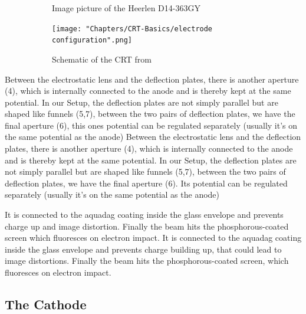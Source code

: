\begin{figure}
	\centering
	\begin{subfigure}{.5\textwidth}
		\centering
		\caption{Image picture of the Heerlen D14-363GY}
		\label{fig:FotoCRT}
	\end{subfigure}%
	\begin{subfigure}{.5\textwidth}
		\centering
		\texttt{[image: "Chapters/CRT-Basics/electrode configuration".png]}
		\caption{Schematic of the CRT from \cite{D14363GY123-manual}}
		\label{fig:SchemeCRT}
	\end{subfigure}
	\caption{}
	\label{}
\end{figure}


Between the electrostatic lens and the deflection plates, there is another aperture (4), which is internally connected to the anode and is thereby kept at the same potential. In our Setup, the deflection plates are not simply parallel but are shaped like funnels (5,7), between the two pairs of deflection plates, we have the final aperture (6), this ones potential can be regulated separately (usually it's on the same potential as the anode) 
Between the electrostatic lens and the deflection plates, there is another aperture (4), which is internally connected to the anode and is thereby kept at the same potential. In our Setup, the deflection plates are not simply parallel but are shaped like funnels (5,7), between the two pairs of deflection plates, we have the final aperture (6). Its potential can be regulated separately (usually it's on the same potential as the anode) 

It is connected to the aquadag coating inside the glass envelope and prevents charge up and image distortion. 
Finally the beam hits the phosphorous-coated screen which fluoresces on electron impact.
It is connected to the aquadag   coating inside the glass envelope and prevents charge building up, that could lead to image distortions. 
Finally the beam hits the phosphorous-coated screen, which fluoresces on electron impact.

\subsection{The Cathode}


